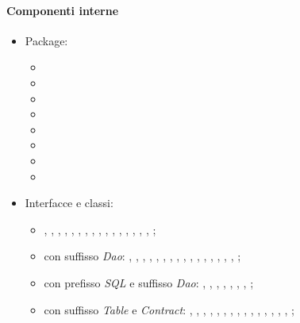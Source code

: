 \documentclass[../Funzionalita.tex]{subfiles}
\begin{document}
			\paragraph*{Componenti interne}
			\begin{itemize}
			
				\item Package:
				\begin{itemize}
					\item[] \model
					\item[] \dataaccess
					\item[] \service
					\item[] \dao
					\item[] \graph
					\item[] \edge
					\item[] \vertex
					\item[] \area
				\end{itemize}
				
				\item Interfacce e classi:
				\begin{itemize}
					\item[] \BuildingMap, \BuildingMapImp, \BuildingInformation, \PointOfInterest, \RegionOfInterest, \EnrichedEdge, \DatabaseService, \BuildingService, \EdgeService, \PhotoService, \PointOfInterestService, \RegionOfInterestService, \ServiceHelper,
					\CursorConverter, \DaoFactoryHelper, \RemoteDaoFactory, \SQLiteDaoFactory;
					
					\item[] con suffisso \textit{Dao}: 
					\SQLDao, \BuildingDao, \CategoryDao, \EdgeDao, \EdgeTypeDao, \PhotoDao, \PointOfInterestDao, \RegionOfInterestDao, \RoiPoiDao, \RemoteBuildingDao, \RemoteCategoryDao, \RemoteEdgeDao, \RemoteEdgeTypeDao,  \RemotePhotoDao,  \RemotePointOfInterestDao, \RemoteRegionOfInterestDao, \RemoteRoiPoiDao;
					
					\item[] con prefisso \textit{SQL} e suffisso \textit{Dao}:
						\SQLiteBuildingDao, \SQLiteCategoryDao, \SQLiteEdgeDao, \SQLitePhotoDao, \SQLiteEdgeTypeDao, \SQLitePointOfInterestDao, \SQLiteRegionOfInterestDao, \SQLiteRoiPoiDao;
						
					\item[] con suffisso \textit{Table} e \textit{Contract}:
						\BuildingTable, \BuildingContract,
					 \CategoryTable, \CategoryContract,
					\EdgeTable, \EdgeContract,
					 \EdgeTypeTable, \EdgeTypeContract,
					\PhotoTable, \PhotoContract,
					 \PointOfInterestTable, \PointOfInterestContract,
					  \RegionOfInterestTable, \RegionOfInterestContract,
					  \RoiPoiTable, \RoiPoiContract;
				\end{itemize}
			\end{itemize}
			
\end{document}
